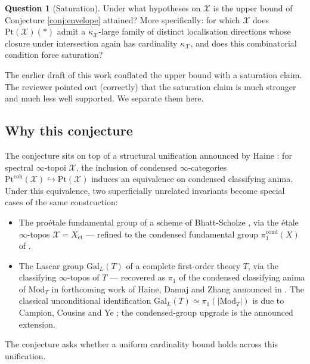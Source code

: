 \documentclass[11pt]{article}
\theoremstyle{definition}
\newtheorem*{question}{Question}
\theoremstyle{plain}
\theoremstyle{remark}
\newcommand{\Pt}{\mathrm{Pt}}
\newcommand{\GalL}{\mathrm{Gal}_{L}}
\begin{document}
\begin{question}[Saturation]\label{q:saturation}
Under what hypotheses on $\mathcal X$ is the upper bound of
Conjecture \ref{conj:envelope} attained? More specifically: for which
$\mathcal X$ does $\Pt(\mathcal X)(\ast)$ admit a $\kappa_{\mathcal X}$-large
family of distinct localisation directions whose closure under intersection
again has cardinality $\kappa_{\mathcal X}$, and does this combinatorial
condition force saturation?
\end{question}

The earlier draft of this work conflated the upper bound with a saturation
claim. The reviewer pointed out (correctly) that the saturation claim is much
stronger and much less well supported. We separate them here.

\subsection{Why this conjecture}

The conjecture sits on top of a structural unification announced by Haine
\cite[Theorem 0.3]{Haine2026classifying}: for spectral $\infty$-topoi
$\mathcal{X}$, the inclusion of condensed $\infty$-categories
$\Pt^{\mathrm{coh}}(\mathcal{X}) \hookrightarrow \Pt(\mathcal{X})$ induces an
equivalence on condensed classifying anima. Under this equivalence, two
superficially unrelated invariants become special cases of the same
construction:

\begin{itemize}
\item The pro\'etale fundamental group of a scheme of Bhatt-Scholze
\cite{BhattScholze2015}, via the \'etale $\infty$-topos
$\mathcal{X} = X_{\mathrm{\acute{e}t}}$ --- refined to the condensed
fundamental group $\pi_1^{\mathrm{cond}}(X)$ of \cite{HHLMMW2025}.
\item The Lascar group $\GalL(T)$ of a complete first-order theory $T$, via
the classifying $\infty$-topos of $T$ --- recovered as $\pi_1$ of the
condensed classifying anima of $\mathrm{Mod}_T$ in forthcoming work of Haine,
Damaj and Zhang announced in \cite[\S 0]{Haine2026classifying}. The classical
unconditional identification $\GalL(T) \simeq \pi_1(|\mathrm{Mod}_T|)$ is due
to Campion, Cousins and Ye \cite{CampionCousinsYe2021}; the condensed-group
upgrade is the announced extension.
\end{itemize}

The conjecture asks whether a uniform cardinality bound holds across this
unification.
\end{document}
